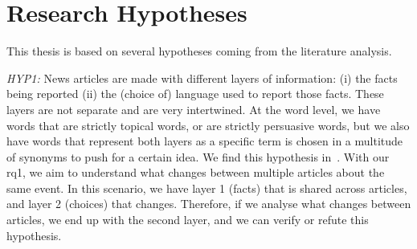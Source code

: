 


\section{\statusgreen Research Hypotheses}
\label{sec:intro_hyp}

This thesis is based on several hypotheses coming from the literature analysis.

\emph{HYP1:} News articles are made with different layers of information: (i) the facts being reported (ii) the (choice of) language used to report those facts. %
These layers are not separate and are very intertwined. At the word level, we have words that are strictly topical words, or are strictly persuasive words, but we also have words that represent both layers as a specific term is chosen in a multitude of synonyms to push for a certain idea.
We find this hypothesis in~\citet{jenkins2013thin,vanderwicken1995news,jang2023proximate,bountouridis2018explaining}.
With our \acrshort{rq}1, we aim to understand what changes between multiple articles about the same event. In this scenario, we have layer 1 (facts) that is shared across articles, and layer 2 (choices) that changes. Therefore, if we analyse what changes between articles, we end up with the second layer, and we can verify or refute this hypothesis.

